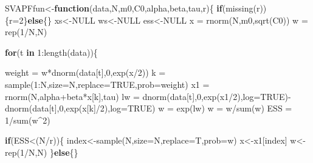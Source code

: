 \documentclass[
]{book}
\newenvironment{Shaded}{\begin{snugshade}}{\end{snugshade}}
\newcommand{\AttributeTok}[1]{\textcolor[rgb]{0.77,0.63,0.00}{#1}}
\newcommand{\ConstantTok}[1]{\textcolor[rgb]{0.00,0.00,0.00}{#1}}
\newcommand{\ControlFlowTok}[1]{\textcolor[rgb]{0.13,0.29,0.53}{\textbf{#1}}}
\newcommand{\DecValTok}[1]{\textcolor[rgb]{0.00,0.00,0.81}{#1}}
\newcommand{\FunctionTok}[1]{\textcolor[rgb]{0.00,0.00,0.00}{#1}}
\newcommand{\NormalTok}[1]{#1}
\newcommand{\OtherTok}[1]{\textcolor[rgb]{0.56,0.35,0.01}{#1}}
\newcommand{\SpecialCharTok}[1]{\textcolor[rgb]{0.00,0.00,0.00}{#1}}
\theoremstyle{break}
\theoremstyle{nonumberplain}
\begin{document}
\begin{Shaded}
\begin{Highlighting}[]
\NormalTok{SVAPFfun}\OtherTok{\textless{}{-}}\ControlFlowTok{function}\NormalTok{(data,N,m0,C0,alpha,beta,tau,r)\{}
  \ControlFlowTok{if}\NormalTok{(}\FunctionTok{missing}\NormalTok{(r))\{r}\OtherTok{=}\DecValTok{2}\NormalTok{\}}\ControlFlowTok{else}\NormalTok{\{\}}
\NormalTok{  xs}\OtherTok{\textless{}{-}}\ConstantTok{NULL}
\NormalTok{  ws}\OtherTok{\textless{}{-}}\ConstantTok{NULL}
\NormalTok{  ess}\OtherTok{\textless{}{-}}\ConstantTok{NULL}
\NormalTok{  x  }\OtherTok{=} \FunctionTok{rnorm}\NormalTok{(N,m0,}\FunctionTok{sqrt}\NormalTok{(C0))}
\NormalTok{  w  }\OtherTok{=} \FunctionTok{rep}\NormalTok{(}\DecValTok{1}\SpecialCharTok{/}\NormalTok{N,N)}
  
  \ControlFlowTok{for}\NormalTok{(t }\ControlFlowTok{in} \DecValTok{1}\SpecialCharTok{:}\FunctionTok{length}\NormalTok{(data))\{}
    
\NormalTok{    weight }\OtherTok{=}\NormalTok{ w}\SpecialCharTok{*}\FunctionTok{dnorm}\NormalTok{(data[t],}\DecValTok{0}\NormalTok{,}\FunctionTok{exp}\NormalTok{(x}\SpecialCharTok{/}\DecValTok{2}\NormalTok{))}
\NormalTok{    k   }\OtherTok{=} \FunctionTok{sample}\NormalTok{(}\DecValTok{1}\SpecialCharTok{:}\NormalTok{N,}\AttributeTok{size=}\NormalTok{N,}\AttributeTok{replace=}\ConstantTok{TRUE}\NormalTok{,}\AttributeTok{prob=}\NormalTok{weight)}
\NormalTok{    x1   }\OtherTok{=} \FunctionTok{rnorm}\NormalTok{(N,alpha}\SpecialCharTok{+}\NormalTok{beta}\SpecialCharTok{*}\NormalTok{x[k],tau)}
\NormalTok{    lw  }\OtherTok{=} \FunctionTok{dnorm}\NormalTok{(data[t],}\DecValTok{0}\NormalTok{,}\FunctionTok{exp}\NormalTok{(x1}\SpecialCharTok{/}\DecValTok{2}\NormalTok{),}\AttributeTok{log=}\ConstantTok{TRUE}\NormalTok{)}\SpecialCharTok{{-}}\FunctionTok{dnorm}\NormalTok{(data[t],}\DecValTok{0}\NormalTok{,}\FunctionTok{exp}\NormalTok{(x[k]}\SpecialCharTok{/}\DecValTok{2}\NormalTok{),}\AttributeTok{log=}\ConstantTok{TRUE}\NormalTok{)}
\NormalTok{    w   }\OtherTok{=} \FunctionTok{exp}\NormalTok{(lw)}
\NormalTok{    w   }\OtherTok{=}\NormalTok{ w}\SpecialCharTok{/}\FunctionTok{sum}\NormalTok{(w)}
\NormalTok{    ESS  }\OtherTok{=} \DecValTok{1}\SpecialCharTok{/}\FunctionTok{sum}\NormalTok{(w}\SpecialCharTok{\^{}}\DecValTok{2}\NormalTok{)}
    
    \ControlFlowTok{if}\NormalTok{(ESS}\SpecialCharTok{\textless{}}\NormalTok{(N}\SpecialCharTok{/}\NormalTok{r))\{}
\NormalTok{      index}\OtherTok{\textless{}{-}}\FunctionTok{sample}\NormalTok{(N,}\AttributeTok{size=}\NormalTok{N,}\AttributeTok{replace=}\NormalTok{T,}\AttributeTok{prob=}\NormalTok{w)}
\NormalTok{      x}\OtherTok{\textless{}{-}}\NormalTok{x1[index]}
\NormalTok{      w}\OtherTok{\textless{}{-}}\FunctionTok{rep}\NormalTok{(}\DecValTok{1}\SpecialCharTok{/}\NormalTok{N,N)}
\NormalTok{    \}}\ControlFlowTok{else}\NormalTok{\{\}}
    

\end{Highlighting}
\end{Shaded}
\end{document}
